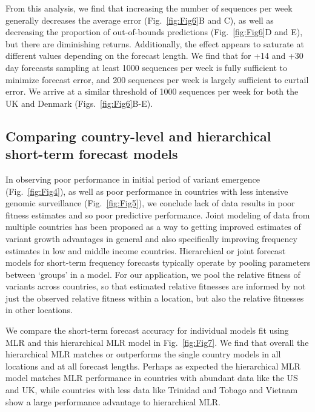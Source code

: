From this analysis, we find that increasing the number of sequences per week generally decreases the average error (Fig.~\ref{fig:Fig6}B and C), as well as decreasing the proportion of out-of-bounds predictions (Fig.~\ref{fig:Fig6}D and E), but there are diminishing returns.
Additionally, the effect appears to saturate at different values depending on the forecast length.
We find that for +14 and +30 day forecasts sampling at least 1000 sequences per week is fully sufficient to minimize forecast error, and 200 sequences per week is largely sufficient to curtail error.
We arrive at a similar threshold of 1000 sequences per week for both the UK and Denmark (Figs.~\ref{fig:Fig6}B-E).


\subsection*{Comparing country-level and hierarchical short-term forecast models}

In observing poor performance in initial period of variant emergence (Fig.~\ref{fig:Fig4}), as well as poor performance in countries with less intensive genomic surveillance (Fig.~\ref{fig:Fig5}), we conclude lack of data results in poor fitness estimates and so poor predictive performance.
Joint modeling of data from multiple countries has been proposed as a way to getting improved estimates of variant growth advantages in general and also specifically improving frequency estimates in low and middle income countries.
Hierarchical or joint forecast models for short-term frequency forecasts typically operate by pooling parameters between `groups' in a model.
For our application, we pool the relative fitness of variants across countries, so that estimated relative fitnesses are informed by not just the observed relative fitness within a location, but also the relative fitnesses in other locations.

We compare the short-term forecast accuracy for individual models fit using MLR and this hierarchical MLR model in Fig.~\ref{fig:Fig7}.
We find that overall the hierarchical MLR matches or outperforms the single country models in all locations and at all forecast lengths.
Perhaps as expected the hierarchical MLR model matches MLR performance in countries with abundant data like the US and UK, while countries with less data like Trinidad and Tobago and Vietnam show a large performance advantage to hierarchical MLR.


